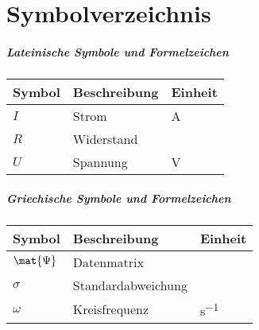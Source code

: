 \chapter*{Symbolverzeichnis}
{}%
%
\paragraph*{Lateinische Symbole und Formelzeichen}
\begin{tabularx}{\textwidth}{@{}l@{\qquad}X@{\quad}p{18mm}}
	Symbol	&	Beschreibung	&	Einheit\\\midrule
	$I$		&	Strom			&	\unit{A}\\
	$R$		&	Widerstand		&	\unit{\Omega}\\
	$U$		&	Spannung		&	\unit{V}\\
\end{tabularx}
%
\paragraph*{Griechische Symbole und Formelzeichen}
\begin{tabularx}{\textwidth}{@{}l@{\qquad}X@{\quad}p{18mm}}
	Symbol			&	Beschreibung		& Einheit\\\midrule
	$\mat{\Psi}$	&	Datenmatrix			&	\\
	$\sigma$		&	Standardabweichung	&	\\
	$\omega$		&	Kreisfrequenz		&	\unit{s^{-1}}
\end{tabularx}